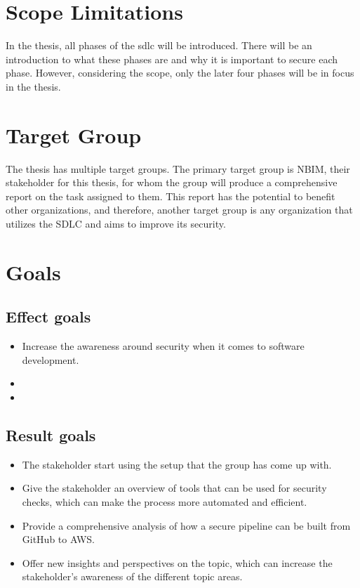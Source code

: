  
\section{Scope Limitations}
In the thesis, all phases of the \acrlong{sdlc} will be introduced. There will be an introduction to what these phases are and why it is important to secure each phase. However, considering the scope, only the later four phases will be in focus in the thesis. 


\section{Target Group}
The thesis has multiple target groups. The primary target group is NBIM, their stakeholder for this thesis, for whom the group will produce a comprehensive report on the task assigned to them. This report has the potential to benefit other organizations, and therefore, another target group is any organization that utilizes the SDLC and aims to improve its security.

\section{Goals}
\subsection{Effect goals}
\begin{itemize}
    \item Increase the awareness around security when it comes to software development. 
    \item 
    \item 
\end{itemize}
\subsection{Result goals}
\begin{itemize}
    \item The stakeholder start using the setup that the group has come up with. 
    \item Give the stakeholder an overview of tools that can be used for security checks, which can make the process more automated and efficient. 
    \item Provide a comprehensive analysis of how a secure pipeline can be built from GitHub to AWS. 
    \item Offer new insights and perspectives on the topic, which can increase the stakeholder's awareness of the different topic areas. 
    
\end{itemize}
